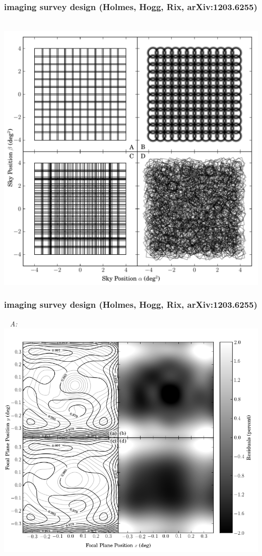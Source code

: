 \documentclass[pdftex]{beamer}
\begin{document}
\begin{frame}
  \frametitle{imaging survey design {\footnotesize (Holmes, Hogg, Rix, arXiv:1203.6255)}}
  ~\hfill%
  \includegraphics[height=\figureheight]{./1203.6255v2/simple_surveys.pdf}
\end{frame}
\begin{frame}
  \frametitle{imaging survey design {\footnotesize (Holmes, Hogg, Rix, arXiv:1203.6255)}}
  ~\hfill%
  \emph{A:}~\includegraphics[height=\figureheight]{./1203.6255v2/A_5000_ff.png}
\end{frame}
\end{document}
